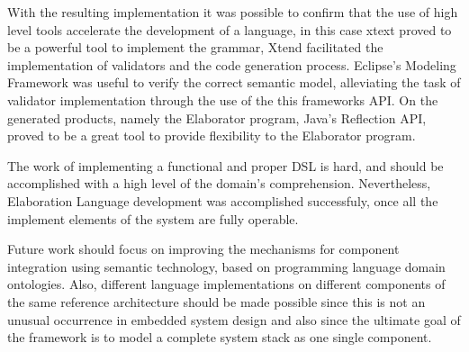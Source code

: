 With the resulting implementation it was possible to confirm that the use of high level tools accelerate the development of a language, in this case xtext proved to be a powerful tool to implement the grammar, Xtend facilitated the implementation of validators and the code generation process. Eclipse's Modeling Framework was useful to verify the correct semantic model, alleviating the task of validator implementation through the use of the this frameworks API. On the generated products, namely the Elaborator program, Java's Reflection API, proved to be a great tool to provide flexibility to the Elaborator program. 

The work of implementing a functional and proper DSL is hard, and should be accomplished with a high level of  the domain's comprehension. Nevertheless, Elaboration Language development was accomplished successfuly, once all the implement elements of the system are fully operable. 

Future work should focus on improving the mechanisms for component integration using semantic technology, based on programming language domain ontologies. 
Also, different language implementations on different components of the same reference architecture should be made possible since this is not an unusual occurrence in embedded system design and also since the ultimate goal of the framework is to model a complete system stack as one single component.